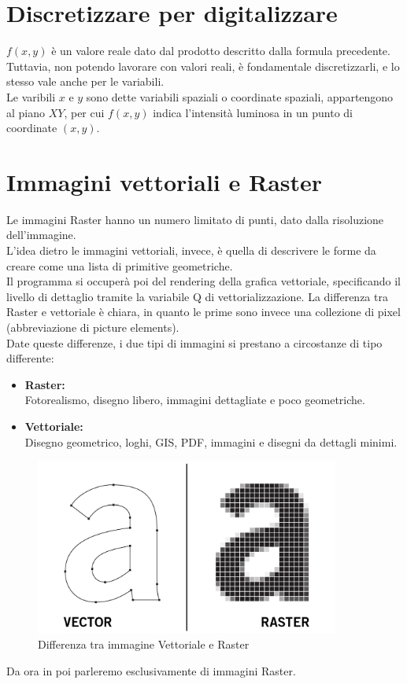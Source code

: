 \documentclass{report}
\begin{document}
\section{Discretizzare per digitalizzare}
$f(x,y)$ è un valore reale dato dal prodotto descritto dalla formula precedente. Tuttavia, non potendo lavorare con valori reali, è fondamentale discretizzarli, e lo stesso vale anche per le variabili.\\
Le varibili $x$ e $y$ sono dette variabili spaziali o coordinate spaziali, appartengono al piano $XY$, per cui $f(x,y)$ indica l'intensità luminosa in un punto di coordinate $(x,y)$.

\section{Immagini vettoriali e Raster}
Le immagini Raster hanno un numero limitato di punti, dato dalla risoluzione dell'immagine.\\
L'idea dietro le immagini vettoriali, invece, è quella di descrivere le forme da creare come una lista di primitive geometriche.\\
Il programma si occuperà poi del rendering della grafica vettoriale, specificando il livello di dettaglio tramite la variabile Q di vettorializzazione.
La differenza tra Raster e vettoriale è chiara, in quanto le prime sono invece una collezione di pixel (abbreviazione di picture elements).\\
Date queste differenze, i due tipi di immagini si prestano a circostanze di tipo differente:
\begin{itemize}
	\item \textbf{Raster:}\\
	      Fotorealismo, disegno libero, immagini dettagliate e poco geometriche.
	\item \textbf{Vettoriale:}\\
	      Disegno geometrico, loghi, GIS, PDF, immagini e disegni da dettagli minimi.
\end{itemize}
\begin{figure}[htp]
	\centering
	\includegraphics[width=10cm]{vectorvsraster.jpg}
	\caption{Differenza tra immagine Vettoriale e Raster}
\end{figure}
Da ora in poi parleremo esclusivamente di immagini Raster.
\end{document}
